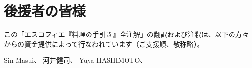 \hypertarget{benefactors}{%
\section{後援者の皆様}\label{benefactors}}

\thispagestyle{empty}

この「エスコフィエ『料理の手引き』全注解」の翻訳および注釈は、以下の方々からの資金提供によって行なわれています（ご支援順、敬称略）。

Sin Masui、\href{20180524-23h,2x,novelsoundsmail@gmail.com}{}
河井健司、\href{20180525-0h14,10x,kwibeng@gmail.com}{} Yuya
HASHIMOTO、\href{20180525-1h40,2x,hashimo0910@gmail.com}{}
